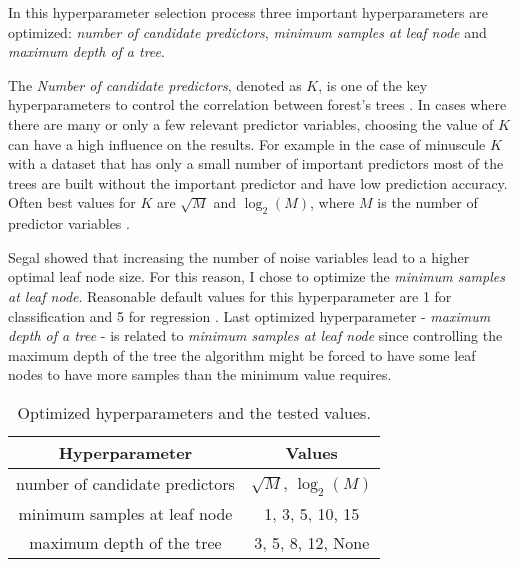 In this hyperparameter selection process three important hyperparameters are optimized: \textit{number of candidate predictors}, \textit{minimum samples at leaf node} and \textit{maximum depth of a tree}.

The \textit{Number of candidate predictors}, denoted as $K$, is one of the key hyperparameters to control the correlation between forest's trees \cite{probst2018hyperparameters}.
In cases where there are many or only a few relevant predictor variables, choosing the value of $K$ can have a high influence on the results. For example in the case of minuscule $K$ with a dataset that has only a small number of important predictors most of the trees are built without the important predictor and have low prediction accuracy. \cite{bernard2009influence} Often best values for $K$ are $\sqrt{M}$ and $\log_2(M)$, where $M$ is the number of predictor variables \cite{bernard2009influence}.

Segal \cite{segal2004machine} showed that increasing the number of noise variables lead to a higher optimal leaf node size. For this reason, I chose to optimize the \textit{minimum samples at leaf node}. Reasonable default values for this hyperparameter are 1 for classification and 5 for regression \cite{probst2018hyperparameters}. Last optimized hyperparameter - \textit{maximum depth of a tree} - is related to \textit{minimum samples at leaf node} since controlling the maximum depth of the tree the algorithm might be forced to have some leaf nodes to have more samples than the minimum value requires.

\begin{table}
    \caption{Optimized hyperparameters and the tested values.}
    \begin{tabular}{ | c | c |}
    \hline
    Hyperparameter & Values\\
    \hline
    number of candidate predictors & $\sqrt{M}$, $\log_2(M)$\\
    minimum samples at leaf node & 1, 3, 5, 10, 15\\
    maximum depth of the tree & 3, 5, 8, 12, None\\
    \hline
   \end{tabular}
   \label{tab:hyperparam}
\end{table}

